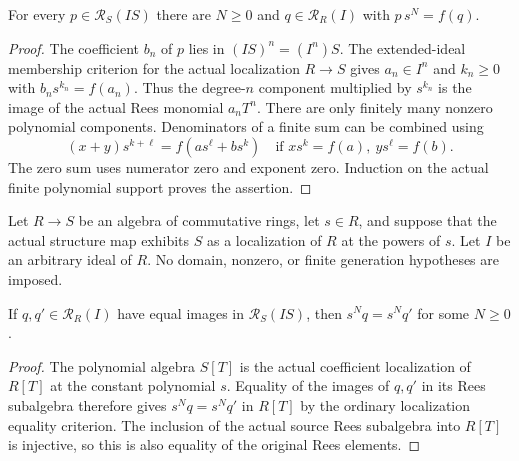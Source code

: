 \begin{lemma}
\label{lem:rees-coefficient-localization-denominators}
\leanok
For every $p\in\mathcal R_S(IS)$ there are $N\ge0$ and
$q\in\mathcal R_R(I)$ with $p\,s^N=f(q)$.
\end{lemma}
\begin{proof}
The coefficient $b_n$ of $p$ lies in $(IS)^n=(I^n)S$.
The extended-ideal membership criterion for the actual localization
$R\to S$ gives $a_n\in I^n$ and $k_n\ge0$ with
$b_ns^{k_n}=f(a_n)$. Thus the degree-$n$ component multiplied
by $s^{k_n}$ is the image of the actual Rees monomial $a_nT^n$.
There are only finitely many nonzero polynomial components.
Denominators of a finite sum can be combined using
\[
 (x+y)s^{k+\ell}=f(as^\ell+bs^k)
 \quad\text{if }xs^k=f(a),\ ys^\ell=f(b).
\]
The zero sum uses numerator zero and exponent zero. Induction on
the actual finite polynomial support proves the assertion.
\end{proof}

\endgroup

\begingroup

Let $R\to S$ be an algebra of commutative rings, let $s\in R$,
and suppose that the actual structure map exhibits $S$ as a
localization of $R$ at the powers of $s$. Let $I$ be an
arbitrary ideal of $R$. No domain, nonzero, or finite generation
hypotheses are imposed.

\begin{lemma}
\label{lem:rees-coefficient-localization-equality}
\leanok
If $q,q'\in\mathcal R_R(I)$ have equal images in
$\mathcal R_S(IS)$, then $s^Nq=s^Nq'$ for some $N\ge0$.
\end{lemma}
\begin{proof}
The polynomial algebra $S[T]$ is the actual coefficient
localization of $R[T]$ at the constant polynomial $s$.
Equality of the images of $q,q'$ in its Rees subalgebra
therefore gives $s^Nq=s^Nq'$ in $R[T]$ by the ordinary
localization equality criterion. The inclusion of the actual
source Rees subalgebra into $R[T]$ is injective, so this is
also equality of the original Rees elements.
\end{proof}

